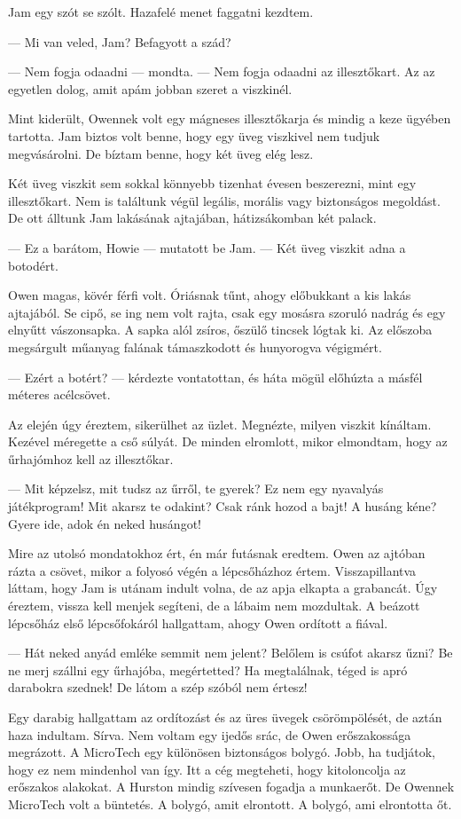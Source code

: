 \documentclass[10pt]{memoir}
\begin{document}
Jam egy szót se szólt. Hazafelé menet faggatni kezdtem.

— Mi van veled, Jam? Befagyott a szád?

— Nem fogja odaadni — mondta. — Nem fogja odaadni az illesztőkart. Az az
egyetlen dolog, amit apám jobban szeret a viszkinél.

Mint kiderült, Owennek volt egy mágneses illesztőkarja és mindig a keze ügyében
tartotta. Jam biztos volt benne, hogy egy üveg viszkivel nem tudjuk
megvásárolni. De bíztam benne, hogy két üveg elég lesz.

Két üveg viszkit sem sokkal könnyebb tizenhat évesen beszerezni, mint egy
illesztőkart. Nem is találtunk végül legális, morális vagy biztonságos
megoldást. De ott álltunk Jam lakásának ajtajában, hátizsákomban két palack.

— Ez a barátom, Howie — mutatott be Jam. — Két üveg viszkit adna a botodért.

Owen magas, kövér férfi volt. Óriásnak tűnt, ahogy előbukkant a kis lakás
ajtajából. Se cipő, se ing nem volt rajta, csak egy mosásra szoruló nadrág és
egy elnyűtt vászonsapka. A sapka alól zsíros, őszülő tincsek lógtak ki. Az
előszoba megsárgult műanyag falának támaszkodott és hunyorogva végigmért.

— Ezért a botért? — kérdezte vontatottan, és háta mögül előhúzta a másfél
méteres acélcsövet.

Az elején úgy éreztem, sikerülhet az üzlet. Megnézte, milyen viszkit kínáltam.
Kezével méregette a cső súlyát. De minden elromlott, mikor elmondtam, hogy az
űrhajómhoz kell az illesztőkar.

— Mit képzelsz, mit tudsz az űrről, te gyerek? Ez nem egy nyavalyás
játékprogram! Mit akarsz te odakint? Csak ránk hozod a bajt! A husáng kéne?
Gyere ide, adok én neked husángot!

Mire az utolsó mondatokhoz ért, én már futásnak eredtem. Owen az ajtóban rázta
a csövet, mikor a folyosó végén a lépcsőházhoz értem. Visszapillantva láttam,
hogy Jam is utánam indult volna, de az apja elkapta a grabancát. Úgy éreztem,
vissza kell menjek segíteni, de a lábaim nem mozdultak. A beázott lépcsőház
első lépcsőfokáról hallgattam, ahogy Owen ordított a fiával.

— Hát neked anyád emléke semmit nem jelent? Belőlem is csúfot akarsz űzni? Be
ne merj szállni egy űrhajóba, megértetted? Ha megtalálnak, téged is apró
darabokra szednek! De látom a szép szóból nem értesz!

Egy darabig hallgattam az ordítozást és az üres üvegek csörömpölését, de aztán
haza indultam. Sírva. Nem voltam egy ijedős srác, de Owen erőszakossága
megrázott. A MicroTech egy különösen biztonságos bolygó. Jobb, ha tudjátok,
hogy ez nem mindenhol van így. Itt a cég megteheti, hogy kitoloncolja az
erőszakos alakokat. A Hurston mindig szívesen fogadja a munkaerőt. De Owennek
MicroTech volt a büntetés. A bolygó, amit elrontott. A bolygó, ami elrontotta
őt.
\end{document}
